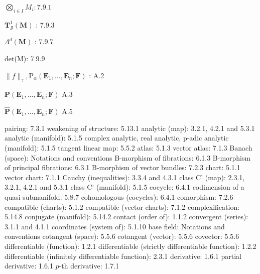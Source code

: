 \(\bigotimes_{i \in I} M_i: 7.9.1\)

\(\mathbf{T}_{\mathbf{J}}^{1}(\mathbf{M})\) : 7.9.3

\(\Lambda^{d}(\mathbf{M})\) : 7.9.7

det(M): 7.9.9

\(\| f\|_{\gamma},\mathrm{P}_{\alpha}(\mathbf{E}_1,\dots ,\mathbf{E}_n;\mathbf{F})\) : A.2

\(\mathbf{P}(\mathbf{E}_1,\dots ,\mathbf{E}_n;\mathbf{F})\) A.3

\(\hat{\mathbf{P}} (\mathbf{E}_1,\dots ,\mathbf{E}_n;\mathbf{F})\) A.5


pairing: 7.3.1 weakening of structure: 5.13.1 analytic (map): 3.2.1, 4.2.1 and 5.3.1 analytic (manifold): 5.1.5 complex analytic, real analytic, p-adic analytic (manifold): 5.1.5 tangent linear map: 5.5.2 atlas: 5.1.3 vector atlas: 7.1.3 Banach (space): Notations and conventions B-morphism of fibrations: 6.1.3 B-morphism of principal fibrations: 6.3.1 B-morphism of vector bundles: 7.2.3 chart: 5.1.1 vector chart: 7.1.1 Cauchy (inequalities): 3.3.4 and 4.3.1 class C' (map): 2.3.1, 3.2.1, 4.2.1 and 5.3.1 class C' (manifold): 5.1.5 cocycle: 6.4.1 codimension of a quasi-submanifold: 5.8.7 cohomologous (cocycles): 6.4.1 comorphism: 7.2.6 compatible (charts): 5.1.2 compatible (vector charts): 7.1.2 complexification: 5.14.8 conjugate (manifold): 5.14.2 contact (order of): 1.1.2 convergent (series): 3.1.1 and 4.1.1 coordinates (system of): 5.1.10 base field: Notations and conventions cotangent (space): 5.5.6 cotangent (vector): 5.5.6 covector: 5.5.6 differentiable (function): 1.2.1 differentiable (strictly differentiable function): 1.2.2 differentiable (infinitely differentiable function): 2.3.1 derivative: 1.6.1 partial derivative: 1.6.1 \(p\)-th derivative: 1.7.1


